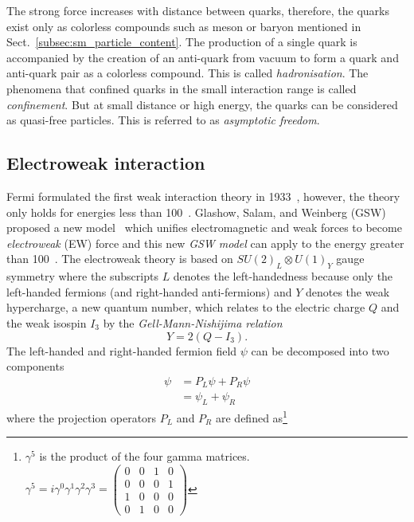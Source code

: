 The strong force increases with distance between quarks, therefore, the quarks exist only as colorless compounds such as meson or baryon mentioned in Sect.~\ref{subsec:sm_particle_content}.
The production of a single quark is accompanied by the creation of an anti-quark from vacuum to form a quark and anti-quark pair as a colorless compound.
This is called \textit{hadronisation}.
The phenomena that confined quarks in the small interaction range is called \textit{confinement}.
But at small distance or high energy, the quarks can be considered as quasi-free particles.
This is referred to as \textit{asymptotic freedom}.


\subsection{Electroweak interaction}
\label{subsec:sm_ewk_interaction}
Fermi formulated the first weak interaction theory in 1933~\cite{Fermi:1934hr}, however, the theory only holds for energies less than 100~{\GeV}.
Glashow, Salam, and Weinberg (GSW) proposed a new model~\cite{Salam:1968rm, Weinberg:1967tq, Glashow:1961tr} which unifies electromagnetic and weak forces to become \textit{electroweak} (EW) force and this new \textit{GSW model} can apply to the energy greater than 100~{\GeV}.
The electroweak theory is based on $SU(2)_{L} \otimes U(1)_{Y}$ gauge symmetry where the subscripts $L$ denotes the left-handedness because only the left-handed fermions (and right-handed anti-fermions) and $Y$ denotes the weak hypercharge, a new quantum number, which relates to the electric charge $Q$ and the weak isospin $I_{3}$ by the \textit{Gell-Mann-Nishijima relation}~\cite{Nakano:1953zz, Gell-Mann:1956iqa}
%
\begin{equation}
    Y = 2(Q - I_{3}).
    \label{eq:sm_hypercharge}
\end{equation}
%
The left-handed and right-handed fermion field $\psi$ can be decomposed into two components
%
\begin{align}
    \psi & = P_{L}\psi + P_{R}\psi\\
         & = \psi_{L} + \psi_{R}
    \label{eq:sm_fermion_field_components}
\end{align}
%
where the projection operators $P_{L}$ and $P_{R}$ are defined as\footnote{$\gamma^{5}$ is the product of the four gamma matrices. $\gamma^{5} = i \gamma^{0} \gamma^{1} \gamma^{2} \gamma^{3} = \left(\begin{matrix}0 & 0 & 1 & 0\\0 & 0 & 0 & 1\\1 & 0 & 0 & 0\\0 & 1 & 0 & 0\end{matrix}\right)$}
